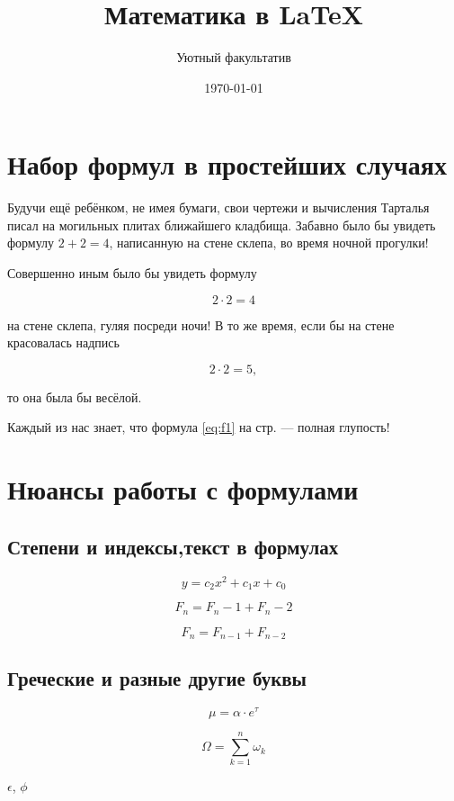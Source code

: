 \documentclass[12pt, a4paper]{article}
\author{Уютный факультатив}
\title{Математика в \LaTeX}
\date{\today}
\begin{document}
\maketitle


\section{Набор формул в простейших случаях}

Будучи ещё ребёнком, не имея бумаги, свои чертежи и вычисления Тарталья писал на  могильных плитах ближайшего кладбища. Забавно было бы увидеть формулу $2 + 2 = 4$, написанную на стене склепа, во время ночной прогулки!

Совершенно иным было бы увидеть формулу

\[2 \cdot 2 = 4\]

на стене склепа, гуляя посреди ночи! В то же время, если бы на стене красовалась надпись

\begin{equation}\label{eq:f1}
2 \cdot 2 = 5,
\end{equation}

то она была бы весёлой.

Каждый из нас знает, что формула \eqref{eq:f1}  на стр. \pageref{eq:f1} --- полная глупость!


\section{Нюансы работы с формулами}

\subsection{Степени и индексы,текст в формулах}

\[ y = c_2 x^2 + c_1 x + c_0 \]

\[ F_n = F_n-1 + F_n-2 \]     %

\[ F_n = F_{n-1} + F_{n-2} \] %


\subsection{Греческие и разные другие буквы}

\[ \mu = \alpha \cdot e^{\tau} \]

\[ \Omega = \sum_{k=1}^{n} \omega_k \]


$\epsilon$, $\phi$ %
\end{document}
